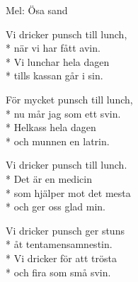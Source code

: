 \begin{SongText}[Studiemedelsrundo]
    \begin{SongInfo}
        Mel: Ösa sand
    \end{SongInfo}
    \begin{SongVerse}
        Vi dricker punsch till lunch,\\*%
        när vi har fått avin.\\*%
        Vi lunchar hela dagen\\*%
        tills kassan går i sin.
    \end{SongVerse}
    \begin{SongVerse}
        För mycket punsch till lunch,\\*%
        nu mår jag som ett svin.\\*%
        Helkass hela dagen\\*%
        och munnen en latrin.
    \end{SongVerse}
    \begin{SongVerse}
        Vi dricker punsch till lunch.\\*%
        Det är en medicin\\*%
        som hjälper mot det mesta\\*%
        och ger oss glad min.
    \end{SongVerse}
    \begin{SongVerse}
        Vi dricker punsch ger stuns\\*%
        åt tentamensamnestin.\\*%
        Vi dricker för att trösta\\*%
        och fira som små svin.
    \end{SongVerse}\end{SongText}
